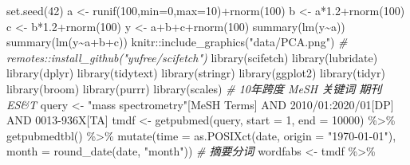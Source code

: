 \documentclass[]{tufte-book}
\newenvironment{Shaded}{}{}
\newcommand{\AttributeTok}[1]{\textcolor[rgb]{0.49,0.56,0.16}{#1}}
\newcommand{\CommentTok}[1]{\textcolor[rgb]{0.38,0.63,0.69}{\textit{#1}}}
\newcommand{\DecValTok}[1]{\textcolor[rgb]{0.25,0.63,0.44}{#1}}
\newcommand{\FloatTok}[1]{\textcolor[rgb]{0.25,0.63,0.44}{#1}}
\newcommand{\FunctionTok}[1]{\textcolor[rgb]{0.02,0.16,0.49}{#1}}
\newcommand{\NormalTok}[1]{#1}
\newcommand{\OtherTok}[1]{\textcolor[rgb]{0.00,0.44,0.13}{#1}}
\newcommand{\SpecialCharTok}[1]{\textcolor[rgb]{0.25,0.44,0.63}{#1}}
\newcommand{\StringTok}[1]{\textcolor[rgb]{0.25,0.44,0.63}{#1}}
\begin{document}
\begin{Shaded}
\begin{Highlighting}[]
\FunctionTok{set.seed}\NormalTok{(}\DecValTok{42}\NormalTok{)}
\NormalTok{a }\OtherTok{\textless{}{-}} \FunctionTok{runif}\NormalTok{(}\DecValTok{100}\NormalTok{,}\AttributeTok{min=}\DecValTok{0}\NormalTok{,}\AttributeTok{max=}\DecValTok{10}\NormalTok{)}\SpecialCharTok{+}\FunctionTok{rnorm}\NormalTok{(}\DecValTok{100}\NormalTok{)}
\NormalTok{b }\OtherTok{\textless{}{-}}\NormalTok{ a}\SpecialCharTok{*}\FloatTok{1.2}\SpecialCharTok{+}\FunctionTok{rnorm}\NormalTok{(}\DecValTok{100}\NormalTok{)}
\NormalTok{c }\OtherTok{\textless{}{-}}\NormalTok{ b}\SpecialCharTok{*}\FloatTok{1.2}\SpecialCharTok{+}\FunctionTok{rnorm}\NormalTok{(}\DecValTok{100}\NormalTok{)}
\NormalTok{y }\OtherTok{\textless{}{-}}\NormalTok{ a}\SpecialCharTok{+}\NormalTok{b}\SpecialCharTok{+}\NormalTok{c}\SpecialCharTok{+}\FunctionTok{rnorm}\NormalTok{(}\DecValTok{100}\NormalTok{)}
\FunctionTok{summary}\NormalTok{(}\FunctionTok{lm}\NormalTok{(y}\SpecialCharTok{\textasciitilde{}}\NormalTok{a))}
\FunctionTok{summary}\NormalTok{(}\FunctionTok{lm}\NormalTok{(y}\SpecialCharTok{\textasciitilde{}}\NormalTok{a}\SpecialCharTok{+}\NormalTok{b}\SpecialCharTok{+}\NormalTok{c))}
\NormalTok{knitr}\SpecialCharTok{::}\FunctionTok{include\_graphics}\NormalTok{(}\StringTok{"data/PCA.png"}\NormalTok{)}
\CommentTok{\# remotes::install\_github("yufree/scifetch")}
\FunctionTok{library}\NormalTok{(scifetch)}
\FunctionTok{library}\NormalTok{(lubridate)}
\FunctionTok{library}\NormalTok{(dplyr)}
\FunctionTok{library}\NormalTok{(tidytext)}
\FunctionTok{library}\NormalTok{(stringr)}
\FunctionTok{library}\NormalTok{(ggplot2)}
\FunctionTok{library}\NormalTok{(tidyr)}
\FunctionTok{library}\NormalTok{(broom)}
\FunctionTok{library}\NormalTok{(purrr)}
\FunctionTok{library}\NormalTok{(scales)}
\CommentTok{\# 10年跨度 MeSH 关键词 期刊ES\&T}
\NormalTok{query }\OtherTok{\textless{}{-}} \StringTok{\textquotesingle{}"mass spectrometry"[MeSH Terms] AND 2010/01:2020/01[DP] AND 0013{-}936X[TA]\textquotesingle{}}
\NormalTok{tmdf }\OtherTok{\textless{}{-}} \FunctionTok{getpubmed}\NormalTok{(query, }\AttributeTok{start =} \DecValTok{1}\NormalTok{, }\AttributeTok{end =} \DecValTok{10000}\NormalTok{) }\SpecialCharTok{\%\textgreater{}\%}
        \FunctionTok{getpubmedtbl}\NormalTok{() }\SpecialCharTok{\%\textgreater{}\%}
        \FunctionTok{mutate}\NormalTok{(}\AttributeTok{time =} \FunctionTok{as.POSIXct}\NormalTok{(date, }\AttributeTok{origin =} \StringTok{"1970{-}01{-}01"}\NormalTok{),}
         \AttributeTok{month =} \FunctionTok{round\_date}\NormalTok{(date, }\StringTok{"month"}\NormalTok{))}
\CommentTok{\# 摘要分词}
\NormalTok{wordfabs }\OtherTok{\textless{}{-}}\NormalTok{ tmdf }\SpecialCharTok{\%\textgreater{}\%}

\end{Highlighting}
\end{Shaded}
\end{document}
